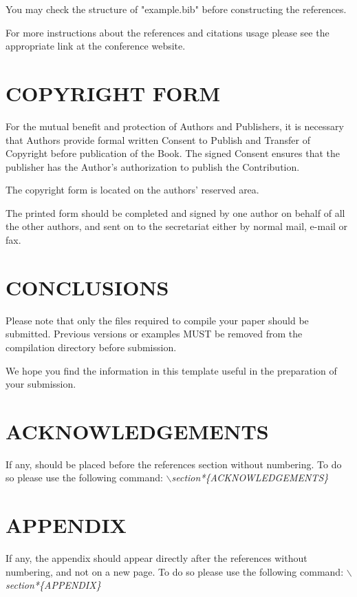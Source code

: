 \documentclass[a4paper,twoside]{article}
\begin{document}
You may check the structure of "example.bib" before constructing the
references.

For more instructions about the references and citations usage
please see the appropriate link at the conference website.

\section{\uppercase{Copyright Form}}

\noindent For the mutual benefit and protection of Authors and
Publishers, it is necessary that Authors provide formal written
Consent to Publish and Transfer of Copyright before publication of
the Book. The signed Consent ensures that the publisher has the
Author's authorization to publish the Contribution.

The copyright form is located on the authors' reserved area.

The printed form should be completed and signed by one author on
behalf of all the other authors, and sent on to the secretariat
either by normal mail, e-mail or fax.

\section{\uppercase{Conclusions}}
\label{sec:conclusion}

\noindent Please note that only the files required to compile your paper should be submitted. Previous versions or examples MUST be removed from the compilation directory before submission.

We hope you find the information in this template useful in the preparation of your submission.

\section*{\uppercase{Acknowledgements}}

\noindent If any, should be placed before the references section
without numbering. To do so please use the following command:
\textit{$\backslash$section*\{ACKNOWLEDGEMENTS\}}



{\small
}


\section*{\uppercase{Appendix}}

\noindent If any, the appendix should appear directly after the
references without numbering, and not on a new page. To do so please use the following command:
\textit{$\backslash$section*\{APPENDIX\}}

\vfill
\end{document}
